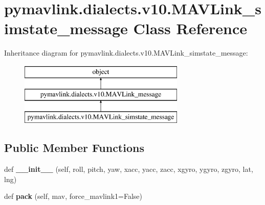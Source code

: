 \hypertarget{classpymavlink_1_1dialects_1_1v10_1_1MAVLink__simstate__message}{}\section{pymavlink.\+dialects.\+v10.\+M\+A\+V\+Link\+\_\+simstate\+\_\+message Class Reference}
\label{classpymavlink_1_1dialects_1_1v10_1_1MAVLink__simstate__message}
Inheritance diagram for pymavlink.\+dialects.\+v10.\+M\+A\+V\+Link\+\_\+simstate\+\_\+message\+:\begin{figure}[H]
\begin{center}
\leavevmode
\includegraphics[height=3.000000cm]{classpymavlink_1_1dialects_1_1v10_1_1MAVLink__simstate__message}
\end{center}
\end{figure}
\subsection*{Public Member Functions}
\begin{DoxyCompactItemize}
\item 
\mbox{\label{classpymavlink_1_1dialects_1_1v10_1_1MAVLink__simstate__message_a2788eb97ce746ba1b8c8d7d15e7c52e9}} 
def {\bfseries \+\_\+\+\_\+init\+\_\+\+\_\+} (self, roll, pitch, yaw, xacc, yacc, zacc, xgyro, ygyro, zgyro, lat, lng)
\item 
\mbox{\label{classpymavlink_1_1dialects_1_1v10_1_1MAVLink__simstate__message_adf79777a8340d39b770a8e1fcf3fe1c2}} 
def {\bfseries pack} (self, mav, force\+\_\+mavlink1=False)
\end{DoxyCompactItemize}
